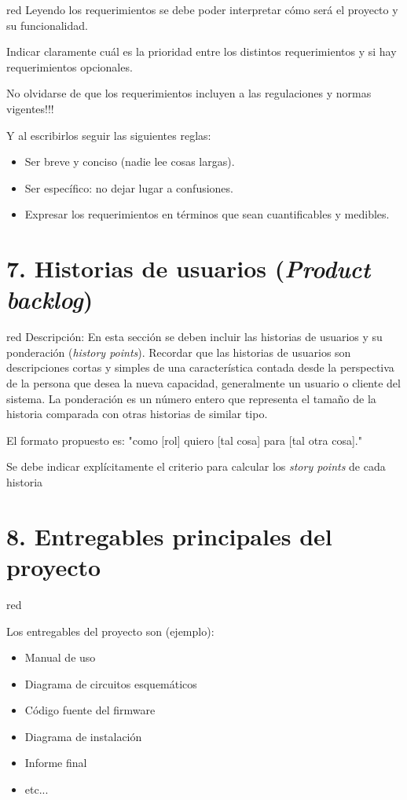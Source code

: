 \documentclass[
11pt, %
]{charter}
\begin{document}
\begin{consigna}{red}
Leyendo los requerimientos se debe poder interpretar cómo será el proyecto y su funcionalidad.

Indicar claramente cuál es la prioridad entre los distintos requerimientos y si hay requerimientos opcionales. 

No olvidarse de que los requerimientos incluyen a las regulaciones y normas vigentes!!!

Y al escribirlos seguir las siguientes reglas:
\begin{itemize}
	\item Ser breve y conciso (nadie lee cosas largas). 
	\item Ser específico: no dejar lugar a confusiones.
	\item Expresar los requerimientos en términos que sean cuantificables y medibles.
\end{itemize}
\end{consigna}


\section{7. Historias de usuarios (\textit{Product backlog})}
\label{sec:backlog}

\begin{consigna}{red}
Descripción: En esta sección se deben incluir las historias de usuarios y su ponderación (\textit{history points}). Recordar que las historias de usuarios son descripciones cortas y simples de una característica contada desde la perspectiva de la persona que desea la nueva capacidad, generalmente un usuario o cliente del sistema. La ponderación es un número entero que representa el tamaño de la historia comparada con otras historias de similar tipo.

El formato propuesto es: "como [rol] quiero [tal cosa] para [tal otra cosa]."

Se debe indicar explícitamente el criterio para calcular los \textit{story points} de cada historia
\end{consigna}

\section{8. Entregables principales del proyecto}
\label{sec:entregables}

\begin{consigna}{red}

Los entregables del proyecto son (ejemplo):

\begin{itemize}
	\item Manual de uso
	\item Diagrama de circuitos esquemáticos
	\item Código fuente del firmware
	\item Diagrama de instalación
	\item Informe final
	\item etc...
\end{itemize}

\end{consigna}
\end{document}
